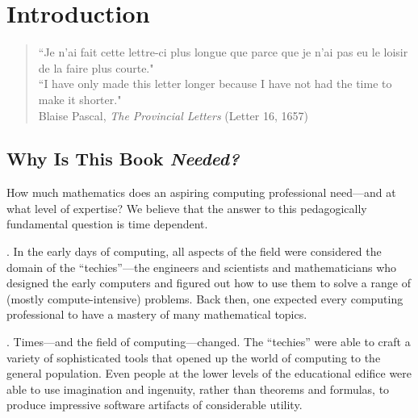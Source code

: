 
\chapter{Introduction}
\label{ch:intro}

\begin{quote}
``Je n'ai fait cette lettre-ci plus longue que parce que je n'ai pas eu le loisir de la faire plus courte."  \\
``I have only made this letter longer because I have not had the time to make it shorter."  \\
\hspace*{1.5in}Blaise Pascal, {\it The Provincial Letters} (Letter 16, 1657)
\end{quote}


\section{Why Is This Book {\em Needed?}}
\label{sec:bookneeded}

How much mathematics does an aspiring computing professional need---and at what level of expertise?  We believe that the answer to this pedagogically fundamental question is time dependent.

\medskip

.
In the early days of computing, all aspects of the field were considered the domain of the ``techies''---the engineers and scientists and mathematicians who designed the early computers and figured out how to use them to solve a range of (mostly compute-intensive) problems.  Back then, one expected every computing professional to have a mastery of many mathematical topics.

\medskip

.
Times---and the field of computing---changed.  The ``techies'' were able to craft a variety of sophisticated tools that opened up the world of computing to the general population.  Even people at the lower levels of the educational edifice were able to use imagination and ingenuity, rather than theorems and formulas, to produce impressive software artifacts of considerable utility.

\medskip

